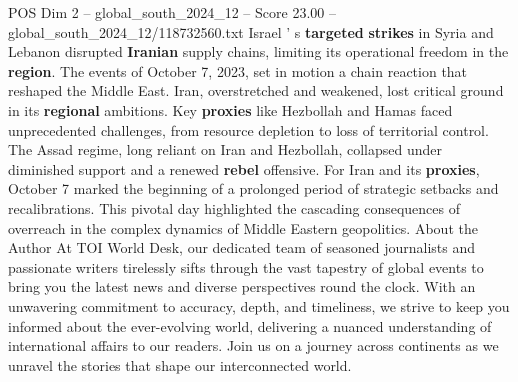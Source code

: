 \begin{textsample}{POS Dim 2 – global\_south\_2024\_12 – Score 23.00 – global\_south\_2024\_12/118732560.txt}
Israel ' s \textbf{targeted} \textbf{strikes} in Syria and Lebanon disrupted \textbf{Iranian} supply chains, limiting its operational freedom in the \textbf{region}.
The events of October 7, 2023, set in motion a chain reaction that reshaped the Middle East.
Iran, overstretched and weakened, lost critical ground in its \textbf{regional} ambitions.
Key \textbf{proxies} like Hezbollah and Hamas faced unprecedented challenges, from resource depletion to loss of territorial control.
The Assad regime, long reliant on Iran and Hezbollah, collapsed under diminished support and a renewed \textbf{rebel} offensive.
For Iran and its \textbf{proxies}, October 7 marked the beginning of a prolonged period of strategic setbacks and recalibrations.
This pivotal day highlighted the cascading consequences of overreach in the complex dynamics of Middle Eastern geopolitics.
About the Author At TOI World Desk, our dedicated team of seasoned journalists and passionate writers tirelessly sifts through the vast tapestry of global events to bring you the latest news and diverse perspectives round the clock.
With an unwavering commitment to accuracy, depth, and timeliness, we strive to keep you informed about the ever-evolving world, delivering a nuanced understanding of international affairs to our readers.
Join us on a journey across continents as we unravel the stories that shape our interconnected world.

\end{textsample}
